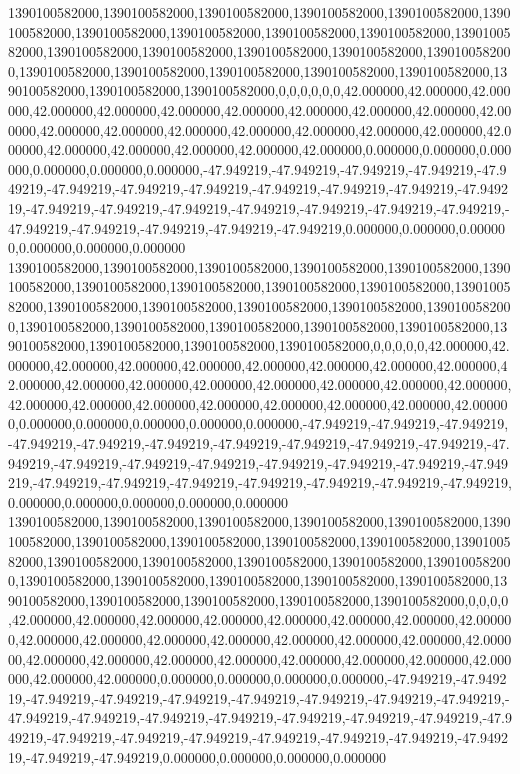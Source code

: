 1390100582000,1390100582000,1390100582000,1390100582000,1390100582000,1390100582000,1390100582000,1390100582000,1390100582000,1390100582000,1390100582000,1390100582000,1390100582000,1390100582000,1390100582000,1390100582000,1390100582000,1390100582000,1390100582000,1390100582000,1390100582000,1390100582000,1390100582000,1390100582000,0,0,0,0,0,0,42.000000,42.000000,42.000000,42.000000,42.000000,42.000000,42.000000,42.000000,42.000000,42.000000,42.000000,42.000000,42.000000,42.000000,42.000000,42.000000,42.000000,42.000000,42.000000,42.000000,42.000000,42.000000,42.000000,42.000000,0.000000,0.000000,0.000000,0.000000,0.000000,0.000000,-47.949219,-47.949219,-47.949219,-47.949219,-47.949219,-47.949219,-47.949219,-47.949219,-47.949219,-47.949219,-47.949219,-47.949219,-47.949219,-47.949219,-47.949219,-47.949219,-47.949219,-47.949219,-47.949219,-47.949219,-47.949219,-47.949219,-47.949219,-47.949219,0.000000,0.000000,0.000000,0.000000,0.000000,0.000000
1390100582000,1390100582000,1390100582000,1390100582000,1390100582000,1390100582000,1390100582000,1390100582000,1390100582000,1390100582000,1390100582000,1390100582000,1390100582000,1390100582000,1390100582000,1390100582000,1390100582000,1390100582000,1390100582000,1390100582000,1390100582000,1390100582000,1390100582000,1390100582000,1390100582000,0,0,0,0,0,42.000000,42.000000,42.000000,42.000000,42.000000,42.000000,42.000000,42.000000,42.000000,42.000000,42.000000,42.000000,42.000000,42.000000,42.000000,42.000000,42.000000,42.000000,42.000000,42.000000,42.000000,42.000000,42.000000,42.000000,42.000000,0.000000,0.000000,0.000000,0.000000,0.000000,-47.949219,-47.949219,-47.949219,-47.949219,-47.949219,-47.949219,-47.949219,-47.949219,-47.949219,-47.949219,-47.949219,-47.949219,-47.949219,-47.949219,-47.949219,-47.949219,-47.949219,-47.949219,-47.949219,-47.949219,-47.949219,-47.949219,-47.949219,-47.949219,-47.949219,0.000000,0.000000,0.000000,0.000000,0.000000
1390100582000,1390100582000,1390100582000,1390100582000,1390100582000,1390100582000,1390100582000,1390100582000,1390100582000,1390100582000,1390100582000,1390100582000,1390100582000,1390100582000,1390100582000,1390100582000,1390100582000,1390100582000,1390100582000,1390100582000,1390100582000,1390100582000,1390100582000,1390100582000,1390100582000,1390100582000,0,0,0,0,42.000000,42.000000,42.000000,42.000000,42.000000,42.000000,42.000000,42.000000,42.000000,42.000000,42.000000,42.000000,42.000000,42.000000,42.000000,42.000000,42.000000,42.000000,42.000000,42.000000,42.000000,42.000000,42.000000,42.000000,42.000000,42.000000,0.000000,0.000000,0.000000,0.000000,-47.949219,-47.949219,-47.949219,-47.949219,-47.949219,-47.949219,-47.949219,-47.949219,-47.949219,-47.949219,-47.949219,-47.949219,-47.949219,-47.949219,-47.949219,-47.949219,-47.949219,-47.949219,-47.949219,-47.949219,-47.949219,-47.949219,-47.949219,-47.949219,-47.949219,-47.949219,0.000000,0.000000,0.000000,0.000000
